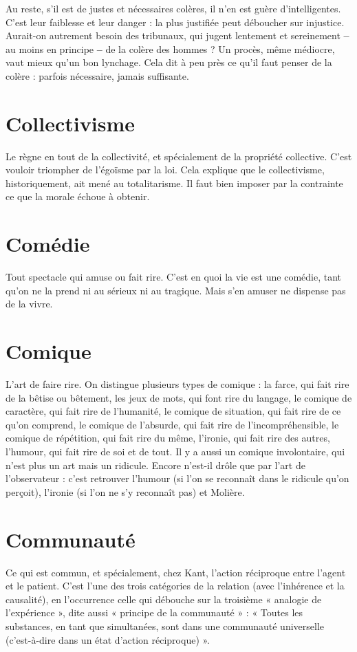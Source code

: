 Au reste, s’il est de justes et nécessaires colères, il n’en est guère d’intelligentes.
C’est leur faiblesse et leur danger : la plus justifiée peut déboucher
sur injustice. Aurait-on autrement besoin des tribunaux, qui jugent lentement
et sereinement {\bf --} au moins en principe {\bf --} de la colère des hommes ?
Un procès, même médiocre, vaut mieux qu’un bon lynchage. Cela dit à
peu près ce qu’il faut penser de la colère : parfois nécessaire, jamais suffisante.

\section{Collectivisme}
Le règne en tout de la collectivité, et spécialement de la
propriété collective. C’est vouloir triompher de l’égoïsme
par la loi. Cela explique que le collectivisme, historiquement, ait mené au totalitarisme.
Il faut bien imposer par la contrainte ce que la morale échoue à
obtenir.

\section{Comédie}
Tout spectacle qui amuse ou fait rire. C’est en quoi la vie est
une comédie, tant qu’on ne la prend ni au sérieux ni au tragique.
Mais s’en amuser ne dispense pas de la vivre.

\section{Comique}
L'art de faire rire. On distingue plusieurs types de comique : la
farce, qui fait rire de la bêtise ou bêtement, les jeux de mots,
qui font rire du langage, le comique de caractère, qui fait rire de l'humanité, le
comique de situation, qui fait rire de ce qu’on comprend, le comique de
l'absurde, qui fait rire de l’incompréhensible, le comique de répétition, qui fait
rire du même, l'ironie, qui fait rire des autres, l'humour, qui fait rire de soi et
de tout. Il y a aussi un comique involontaire, qui n’est plus un art mais un
ridicule. Encore n'est-il drôle que par l’art de l’observateur : c’est retrouver
l’humour (si l’on se reconnaît dans le ridicule qu’on perçoit), l'ironie (si l’on ne
s’y reconnaît pas) et Molière.

\section{Communauté}
Ce qui est commun, et spécialement, chez Kant, l’action
réciproque entre l’agent et le patient. C’est l’une des trois
catégories de la relation (avec l’inhérence et la causalité), en l’occurrence celle
qui débouche sur la troisième « analogie de l’expérience », dite aussi « principe
de la communauté » : « Toutes les substances, en tant que simultanées, sont
dans une communauté universelle (c’est-à-dire dans un état d’action réciproque) ».

